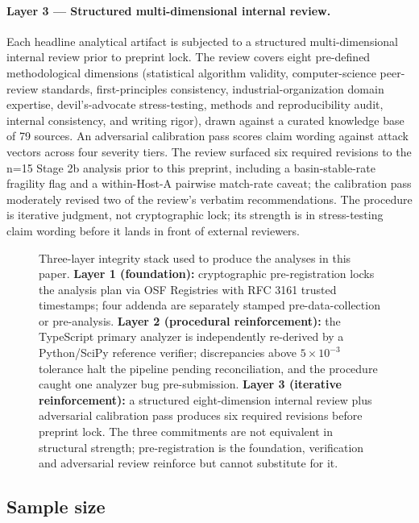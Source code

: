 \paragraph{Layer 3 --- Structured multi-dimensional internal review.}
Each headline analytical artifact is subjected to a structured multi-dimensional internal review prior to preprint lock. The review covers eight pre-defined methodological dimensions (statistical algorithm validity, computer-science peer-review standards, first-principles consistency, industrial-organization domain expertise, devil's-advocate stress-testing, methods and reproducibility audit, internal consistency, and writing rigor), drawn against a curated knowledge base of 79 sources. An adversarial calibration pass scores claim wording against attack vectors across four severity tiers. The review surfaced six required revisions to the n=15 Stage 2b analysis prior to this preprint, including a basin-stable-rate fragility flag and a within-Host-A pairwise match-rate caveat; the calibration pass moderately revised two of the review's verbatim recommendations. The procedure is iterative judgment, not cryptographic lock; its strength is in stress-testing claim wording before it lands in front of external reviewers.

\begin{figure}[h]
\centering
\resizebox{\textwidth}{!}{}
\caption{Three-layer integrity stack used to produce the analyses in this paper. \textbf{Layer 1 (foundation):} cryptographic pre-registration locks the analysis plan via OSF Registries with RFC 3161 trusted timestamps; four addenda are separately stamped pre-data-collection or pre-analysis. \textbf{Layer 2 (procedural reinforcement):} the TypeScript primary analyzer is independently re-derived by a Python/SciPy reference verifier; discrepancies above $5 \times 10^{-3}$ tolerance halt the pipeline pending reconciliation, and the procedure caught one analyzer bug pre-submission. \textbf{Layer 3 (iterative reinforcement):} a structured eight-dimension internal review plus adversarial calibration pass produces six required revisions before preprint lock. The three commitments are not equivalent in structural strength; pre-registration is the foundation, verification and adversarial review reinforce but cannot substitute for it.}
\label{fig:methodology-flow}
\end{figure}

\subsection{Sample size}
\label{sec:methods-sample-size}

